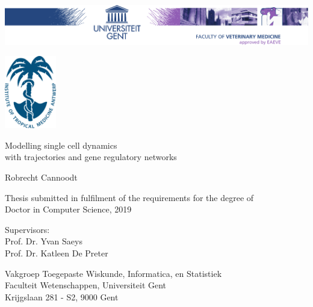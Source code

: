 
\begin{titlepage}
	\centering
	\includegraphics[width=\textwidth]{fig/DI-eps-converted-to.pdf}
	
	\vspace{1cm}
	
	\includegraphics[width=2.25cm]{fig/ITGlogo_new} 
	\vspace{2.25cm}
	
	{\Huge \textsf{Modelling single cell dynamics\\with trajectories and gene regulatory networks}}
	
	\vspace{2.25cm}
	
	{\LARGE \textsf{Robrecht Cannoodt}}
	
	\vspace{2.25cm}
	
	{\textsf{Thesis submitted in fulfilment of the requirements for the degree of \\Doctor in Computer Science, 2019}}
	
	\vfill
	
	{\textsf{Supervisors: \\
			Prof. Dr. Yvan Saeys\\Prof. Dr. Katleen De Preter}}
	
	\vfill
	
	{\textsf{Vakgroep Toegepaste Wiskunde, Informatica, en Statistiek\\
			Faculteit Wetenschappen, Universiteit Gent \\
			Krijgslaan 281 - S2, 9000 Gent}}
\end{titlepage}

